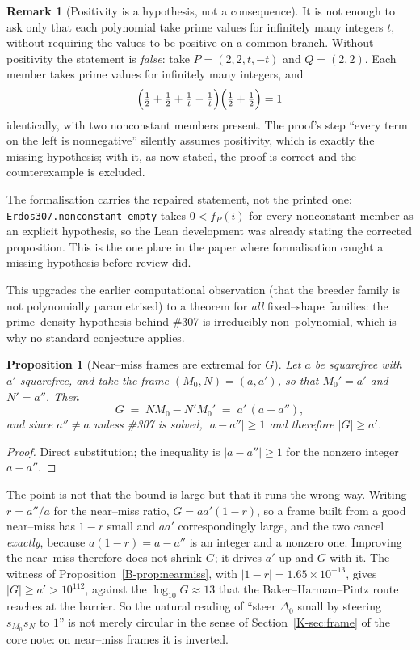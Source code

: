 \documentclass[11pt]{article}
\newtheorem{proposition}[theorem]{Proposition}
\theoremstyle{definition}
\newtheorem{remark}[theorem]{Remark}
\begin{document}
\begin{remark}[Positivity is a hypothesis, not a consequence]\label{rem:nopolyerratum}
It is not enough to ask only that each polynomial take prime values for infinitely many integers $t$, without requiring the values to be positive on a common branch. Without positivity the statement is \emph{false}: take $P=(2,2,t,-t)$ and $Q=(2,2)$. Each member takes prime values for infinitely many
integers, and
\[ \Bigl(\tfrac12+\tfrac12+\tfrac1t-\tfrac1t\Bigr)\Bigl(\tfrac12+\tfrac12\Bigr)=1 \]
identically, with two nonconstant members present. The proof's step ``every term on the left is
nonnegative'' silently assumes positivity, which is exactly the missing hypothesis; with it, as now
stated, the proof is correct and the counterexample is excluded.

The formalisation carries the repaired statement, not the printed one:
\texttt{Erdos307.nonconstant\_empty} takes $0<f_P(i)$ for every nonconstant member as an explicit
hypothesis, so the Lean development was already stating the corrected proposition. This is the one
place in the paper where formalisation caught a missing hypothesis before review did.
\end{remark}

\noindent This upgrades the earlier computational observation (that the breeder family is not
polynomially parametrised) to a theorem for \emph{all} fixed--shape families: the prime--density
hypothesis behind \#307 is irreducibly non--polynomial, which is why no standard conjecture applies.

\begin{proposition}[Near--miss frames are extremal for $G$]\label{prop:nearframe}
Let $a$ be squarefree with $a'$ squarefree, and take the frame $(M_0,N)=(a,a')$, so that
$M_0'=a'$ and $N'=a''$. Then
\[ G\;=\;NM_0-N'M_0'\;=\;a'\,(a-a''), \]
and since $a''\ne a$ unless \#307 is solved, $|a-a''|\ge1$ and therefore $|G|\ge a'$.
\end{proposition}
\begin{proof}
Direct substitution; the inequality is $|a-a''|\ge1$ for the nonzero integer $a-a''$.
\end{proof}

The point is not that the bound is large but that it runs the wrong way. Writing $r=a''/a$ for the
near--miss ratio, $G=aa'(1-r)$, so a frame built from a good near--miss has $1-r$ small and $aa'$
correspondingly large, and the two cancel \emph{exactly}, because $a(1-r)=a-a''$ is an integer and a
nonzero one. Improving the near--miss therefore does not shrink $G$; it drives $a'$ up and $G$ with
it. The witness of Proposition~\ref{B-prop:nearmiss}, with $|1-r|=1.65\times10^{-13}$, gives
$|G|\ge a'>10^{112}$, against the $\log_{10}G\approx13$ that the Baker--Harman--Pintz route reaches
at the barrier. So the natural reading of ``steer $\Delta_0$ small by steering $s_{M_0}s_N$ to $1$''
is not merely circular in the sense of Section~\ref{K-sec:frame} of the core note: on near--miss frames it is inverted.
\end{document}
